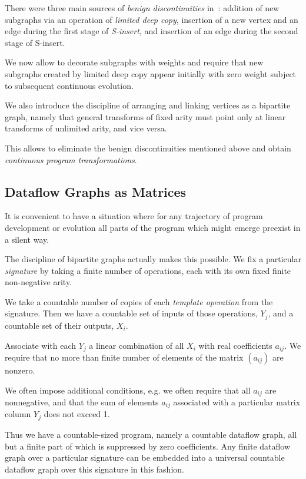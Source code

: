 \documentclass[withtimes]{easychair}
\begin{document}
There were three main sources of {\em benign discontinuities} in~\cite{MBukatinMatthews}:
addition of new subgraphs via an operation of {\em limited deep copy}, insertion of a new vertex and
an edge during the first stage of {\em S-insert}, and insertion of an edge during the second stage of
S-insert.

We now allow to decorate subgraphs with weights and require that new subgraphs created by
limited deep copy appear initially with zero weight subject to subsequent continuous evolution.

We also introduce the discipline of arranging and linking vertices as a bipartite graph, namely
that general transforms of fixed arity must point only at linear transforms of unlimited arity,
and vice versa.

This allows to eliminate the benign discontinuities mentioned above and obtain {\em continuous
program transformations}.

\subsection{Dataflow Graphs as Matrices}

It is convenient to have a situation where for any trajectory of program development or
evolution all parts of the program which might emerge preexist in a silent way.

The discipline of bipartite graphs actually makes this possible. We fix a particular
{\em signature} by taking a finite number of operations, each with its own fixed finite non-negative arity.

We take a countable number of copies of each {\em template operation} from the signature. Then we
have a countable set of inputs of those operations, $Y_j$, and a countable set of their
outputs, $X_i$.

Associate with each $Y_j$ a linear combination of all $X_i$ with real coefficients $a_{ij}$.
We require that no more than finite number of elements of the matrix $(a_{ij})$ are nonzero.

We often impose additional conditions, e.g. we often require that all $a_{ij}$ are
nonnegative, and that the sum of elements $a_{ij}$ associated with a particular matrix column $Y_j$
does not exceed 1.

Thus we have a countable-sized program, namely a countable dataflow graph, all but
a finite part of which is suppressed by zero coefficients. Any finite dataflow graph
over a particular signature can be embedded into a universal countable dataflow graph
over this signature in this fashion.
\end{document}
